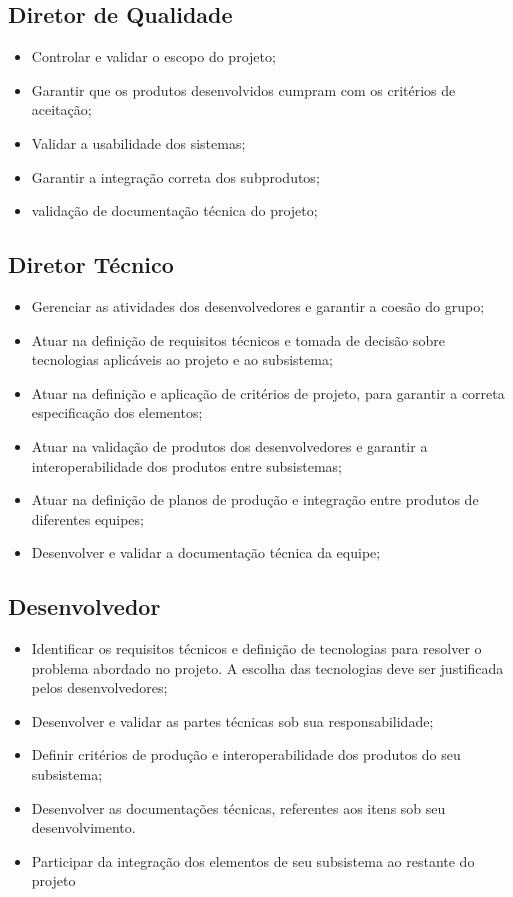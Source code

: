 \begin{apendicesenv}
\subsection{Diretor de Qualidade}
\begin{itemize}
    \item Controlar e validar o escopo do projeto;
    \item Garantir que os produtos desenvolvidos cumpram com os critérios de aceitação;
    \item Validar a usabilidade dos sistemas;
    \item Garantir a integração correta dos subprodutos;
    \item validação de documentação técnica do projeto;
\end{itemize}

\subsection{Diretor Técnico}
\begin{itemize}
    \item Gerenciar as atividades dos desenvolvedores e garantir a coesão do grupo;
    \item Atuar na definição de requisitos técnicos e tomada de decisão sobre tecnologias aplicáveis ao projeto e ao subsistema;
    \item Atuar na definição e aplicação de critérios de projeto, para garantir a correta especificação dos elementos;
    \item Atuar na validação de produtos dos desenvolvedores e garantir a interoperabilidade dos produtos entre subsistemas;
    \item Atuar na definição de planos de produção e integração entre produtos de diferentes equipes;
    \item Desenvolver e validar a documentação técnica da equipe;
\end{itemize}

\subsection{Desenvolvedor}
\begin{itemize}
    \item Identificar os requisitos técnicos e definição de tecnologias para resolver o problema abordado no projeto. A escolha das tecnologias deve ser justificada pelos desenvolvedores;
    \item Desenvolver e validar as partes técnicas sob sua responsabilidade;
    \item Definir critérios de produção e interoperabilidade dos produtos do seu subsistema;
    \item Desenvolver as documentações técnicas, referentes aos itens sob seu desenvolvimento.
    \item Participar da integração dos elementos de seu subsistema ao restante do projeto
\end{itemize}


\end{apendicesenv}
